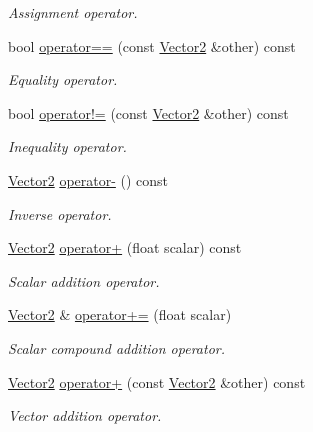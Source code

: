 \begin{DoxyCompactItemize}
\begin{DoxyCompactList}\small\item\em Assignment operator. \end{DoxyCompactList}\item 
bool \hyperlink{classchaos_1_1gfx_1_1_vector2_aee957f369c27fd28b8f387e13c4fb085}{operator==} (const \hyperlink{classchaos_1_1gfx_1_1_vector2}{Vector2} \&other) const 
\begin{DoxyCompactList}\small\item\em Equality operator. \end{DoxyCompactList}\item 
bool \hyperlink{classchaos_1_1gfx_1_1_vector2_ab90c48bca7d89e8594b3eef0571c7824}{operator!=} (const \hyperlink{classchaos_1_1gfx_1_1_vector2}{Vector2} \&other) const 
\begin{DoxyCompactList}\small\item\em Inequality operator. \end{DoxyCompactList}\item 
\hyperlink{classchaos_1_1gfx_1_1_vector2}{Vector2} \hyperlink{classchaos_1_1gfx_1_1_vector2_a339621319bf9b26a0116fe95086a240e}{operator-\/} () const 
\begin{DoxyCompactList}\small\item\em Inverse operator. \end{DoxyCompactList}\item 
\hyperlink{classchaos_1_1gfx_1_1_vector2}{Vector2} \hyperlink{classchaos_1_1gfx_1_1_vector2_a4e28157ab025cdc32da4017758bef4ff}{operator+} (float scalar) const 
\begin{DoxyCompactList}\small\item\em Scalar addition operator. \end{DoxyCompactList}\item 
\hyperlink{classchaos_1_1gfx_1_1_vector2}{Vector2} \& \hyperlink{classchaos_1_1gfx_1_1_vector2_a4028e1202905536b973b311e678d1c52}{operator+=} (float scalar)
\begin{DoxyCompactList}\small\item\em Scalar compound addition operator. \end{DoxyCompactList}\item 
\hyperlink{classchaos_1_1gfx_1_1_vector2}{Vector2} \hyperlink{classchaos_1_1gfx_1_1_vector2_a52eb8f6053de6ae27773d42763ab2107}{operator+} (const \hyperlink{classchaos_1_1gfx_1_1_vector2}{Vector2} \&other) const 
\begin{DoxyCompactList}\small\item\em Vector addition operator. \end{DoxyCompactList}\item 

\end{DoxyCompactItemize}
